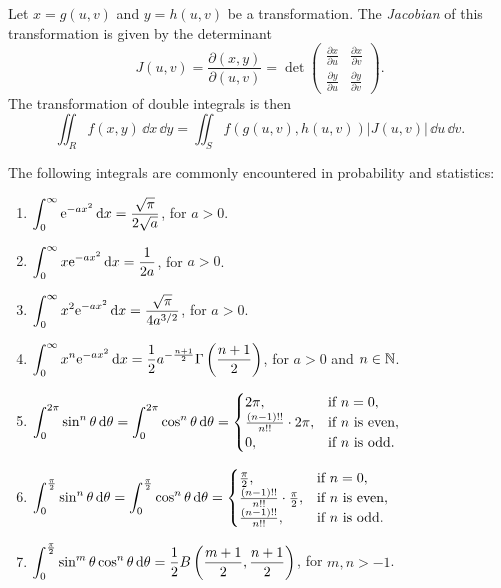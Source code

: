 \begin{definition}[Jacobian]
  Let $x = g(u, v)$ and $y = h(u, v)$ be a transformation. The \emph{Jacobian} of this transformation is given by the determinant
  \[
    J(u, v) = \frac{\partial(x, y)}{\partial(u, v)} = \det \begin{pmatrix}
      \frac{\partial x}{\partial u} & \frac{\partial x}{\partial v} \\
      \frac{\partial y}{\partial u} & \frac{\partial y}{\partial v}
    \end{pmatrix}.
  \]
  The transformation of double integrals is then
  \[
    \iint_R f(x, y)\,\dd x\,\dd y = \iint_S f(g(u, v), h(u, v)) |J(u, v)|\,\dd u\,\dd v.
  \]
\end{definition}

\begin{theorem}\label{thm:important_integrals}
  The following integrals are commonly encountered in probability and statistics:
  \begin{enumerate}
    \item\label{int:gaussian} $\displaystyle \int_0^\infty \mathrm{e}^{-ax^2}\,\mathrm{d} x = \frac{\sqrt{\mathrm{\pi}}}{2\sqrt{a}}$, for $a > 0$.
    \item\label{int:linear} $\displaystyle \int_0^\infty x \mathrm{e}^{-ax^2}\,\mathrm{d} x = \frac{1}{2a}$, for $a > 0$.
    \item\label{int:quadratic} $\displaystyle \int_0^\infty x^2 \mathrm{e}^{-ax^2}\,\mathrm{d} x = \frac{\sqrt{\mathrm{\pi}}}{4a^{3/2}}$, for $a > 0$.
    \item\label{int:general} $\displaystyle \int_0^\infty x^n \mathrm{e}^{-ax^2}\,\mathrm{d} x = \frac{1}{2} a^{-\frac{n+1}{2}} \Gamma\left(\frac{n+1}{2}\right)$, for $a > 0$ and $n \in \mathbb{N}$.
    \item\label{int:sin-cos} $\displaystyle \int_0^{2\mathrm{\pi}} \sin^n \theta\, \mathrm{d}\theta = \int_0^{2\mathrm{\pi}} \cos^n \theta\,\mathrm{d}\theta = \begin{cases}
      2\mathrm{\pi}, & \text{if $n = 0$}, \\
      \frac{(n-1)!!}{n!!} \cdot 2\mathrm{\pi}, & \text{if $n$ is even}, \\
      0, & \text{if $n$ is odd}.
    \end{cases}$
    \item\label{int:sin-cos-half} $\displaystyle \int_0^{\frac{\mathrm{\pi}}{2}} \sin^n \theta\,\mathrm{d}\theta = \int_0^{\frac{\mathrm{\pi}}{2}} \cos^n \theta\,\mathrm{d}\theta = \begin{cases}
      \frac{\mathrm{\pi}}{2}, & \text{if $n = 0$}, \\
      \frac{(n-1)!!}{n!!} \cdot \frac{\mathrm{\pi}}{2}, & \text{if $n$ is even}, \\
      \frac{(n-1)!!}{n!!}, & \text{if $n$ is odd}.
    \end{cases}$
    \item\label{int:sin-cos-half-general} $\displaystyle \int_0^{\frac{\mathrm{\pi}}{2}} \sin^m \theta \cos^n \theta\,\mathrm{d}\theta = \frac{1}{2} B\left(\frac{m+1}{2}, \frac{n+1}{2}\right)$, for $m, n > -1$.
  \end{enumerate}
\end{theorem}

